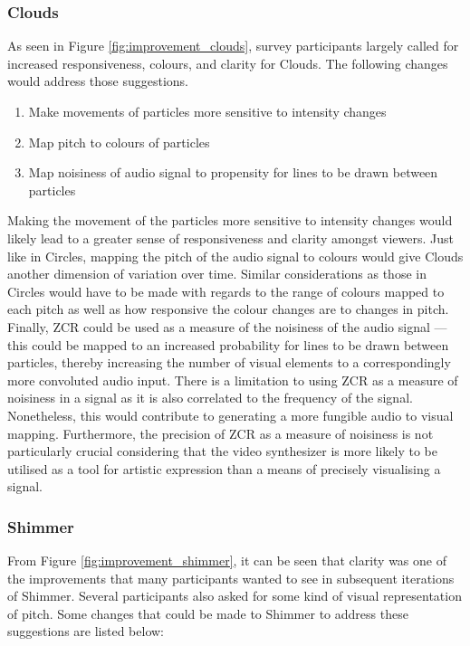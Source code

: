 \documentclass[../initial_thesis.tex]{subfiles}
\begin{document}
\subsubsection{Clouds}
As seen in Figure \ref{fig:improvement_clouds}, survey participants largely called for increased responsiveness, colours, and clarity for Clouds. The following changes would address those suggestions.

\begin{enumerate}
\item {Make movements of particles more sensitive to intensity changes}
\item {Map pitch to colours of particles}
\item {Map noisiness of audio signal to propensity for lines to be drawn between particles}
\end{enumerate}

Making the movement of the particles more sensitive to intensity changes would likely lead to a greater sense of responsiveness and clarity amongst viewers. Just like in Circles, mapping the pitch of the audio signal to colours would give Clouds another dimension of variation over time. Similar considerations as those in Circles would have to be made with regards to the range of colours mapped to each pitch as well as how responsive the colour changes are to changes in pitch. Finally, ZCR could be used as a measure of the noisiness of the audio signal \cite{Peeters2004} --- this could be mapped to an increased probability for lines to be drawn between particles, thereby increasing the number of visual elements to a correspondingly more convoluted audio input. There is a limitation to using ZCR as a measure of noisiness in a signal as it is also correlated to the frequency of the signal. Nonetheless, this would contribute to generating a more fungible audio to visual mapping. Furthermore, the precision of ZCR as a measure of noisiness is not particularly crucial considering that the video synthesizer is more likely to be utilised as a tool for artistic expression than a means of precisely visualising a signal.

\subsubsection{Shimmer}\label{sec:lowlevelaudio}
From Figure \ref{fig:improvement_shimmer}, it can be seen that clarity was one of the improvements that many participants wanted to see in subsequent iterations of Shimmer. Several participants also asked for some kind of visual representation of pitch. Some changes that could be made to Shimmer to address these suggestions are listed below:
\end{document}
